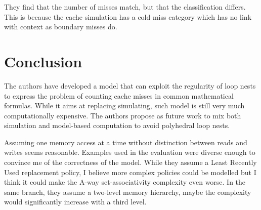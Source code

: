 \documentclass{article}
\begin{document}
They find that the number of misses match, but that the classification differs.
This is because the cache simulation has a cold miss category which has no link with context as boundary misses do.


\section{Conclusion}
\label{critic}
The authors have developed a model that can exploit the regularity of loop nests to express the problem of counting cache misses in common mathematical formulas.
While it aims at replacing simulating, such model is still very much computationally expensive.
The authors propose as future work to mix both simulation and model-based computation to avoid polyhedral loop nests.

Assuming one memory access at a time without distinction between reads and writes seems reasonable.
Examples used in the evaluation were diverse enough to convince me of the correctness of the model.
While they assume a Least Recently Used replacement policy, I believe more complex policies could be modelled but I think it could make the A-way set-associativity complexity even worse.
In the same branch, they assume a two-level memory hierarchy, maybe the complexity would significantly increase with a third level.




\end{document}
